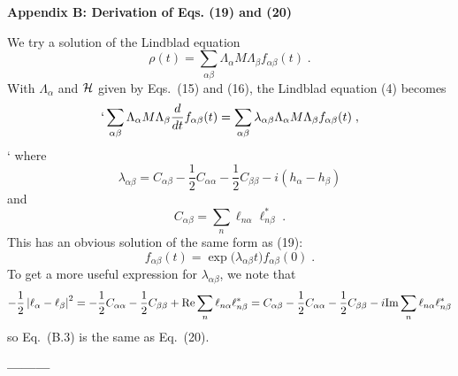 \documentclass[12pt]{article}
\begin{document}
\vspace{10pt}

\begin{center}
{\bf Appendix B: Derivation of Eqs. (19) and (20) }
\end{center}
\renewcommand{\theequation}{B.\arabic{equation}}
\setcounter{equation}{0}

We try a solution of the Lindblad equation
\begin{equation}
\rho(t)=\sum_{\alpha\beta}\Lambda_\alpha M \Lambda_\beta f_{\alpha\beta}(t)\;.
\end{equation}
With $\Lambda_\alpha$ and ${\cal H}$ given by Eqs.~(15) and (16), the Lindblad equation (4) becomes
\begin{equation}`\sum_{\alpha\beta}\Lambda_\alpha M \Lambda_\beta\frac{d}{dt} f_{\alpha\beta}(t)=\sum_{\alpha\beta}\lambda_{\alpha\beta}\Lambda_\alpha M \Lambda_\beta f_{\alpha\beta}(t)\;,
\end{equation}`
where 
\begin{equation}
\lambda_{\alpha\beta}=C_{\alpha\beta}-\frac{1}{2}C_{\alpha\alpha}-\frac{1}{2}C_{\beta\beta}-i(h_\alpha-h_\beta)
\end{equation}
and
\begin{equation}
C_{\alpha\beta}=\sum_n \ell_{n\alpha}\ell_{n\beta}^*\;.
\end{equation}
This has an obvious solution of the same form as (19):
\begin{equation}
f_{\alpha\beta}(t)=\exp\Big(\lambda_{\alpha\beta}t\Big)f_{\alpha\beta}(0)\;.
\end{equation}
To get a more useful expression for $\lambda_{\alpha\beta}$, we note that 
$$-\frac{1}{2}\left|\ell_{\alpha}-\ell_{\beta}\right|^2=-\frac{1}{2}C_{\alpha\alpha}-\frac{1}{2}C_{\beta\beta}+{\rm Re}\sum_n \ell_{n\alpha}\ell_{n\beta}^*=C_{\alpha\beta}-\frac{1}{2}C_{\alpha\alpha}-\frac{1}{2}C_{\beta\beta}-i{\rm Im}\sum_n \ell_{n\alpha}\ell_{n\beta}^* $$
so Eq.~(B.3) is the same as Eq.~(20).



\vspace{10pt}

\begin{center}
{\bf ---------}
\end{center}

\vspace{10pt}
\end{document}
